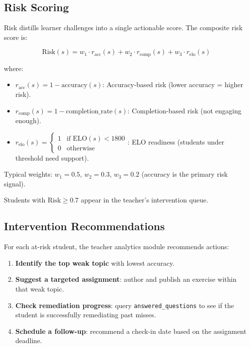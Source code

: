 \documentclass[sigconf,authordraft,twoside]{acmart}
\newcommand{\tech}[1]{\textcolor{brandblue}{\nolinkurl{#1}}}
\begin{document}
\subsection{Risk Scoring} \label{sec:risk-scoring}

Risk distills learner challenges into a single actionable score. The composite risk score is:

\begin{equation}
\text{Risk}(s) = w_1 \cdot r_{\text{acc}}(s) + w_2 \cdot r_{\text{comp}}(s) + w_3 \cdot r_{\text{elo}}(s)
\end{equation}

where:

\begin{itemize}
\item $r_{\text{acc}}(s) = 1 - \text{accuracy}(s)$: Accuracy-based risk (lower accuracy = higher risk).
\item $r_{\text{comp}}(s) = 1 - \text{completion\_rate}(s)$: Completion-based risk (not engaging enough).
\item $r_{\text{elo}}(s) = \begin{cases} 1 & \text{if } \text{ELO}(s) < 1800 \\ 0 & \text{otherwise} \end{cases}$: ELO readiness (students under threshold need support).
\end{itemize}

Typical weights: $w_1 = 0.5$, $w_2 = 0.3$, $w_3 = 0.2$ (accuracy is the primary risk signal).

Students with $\text{Risk} \geq 0.7$ appear in the teacher's intervention queue.

\subsection{Intervention Recommendations}

For each at-risk student, the teacher analytics module recommends actions:

\begin{enumerate}
\item \textbf{Identify the top weak topic} with lowest accuracy.
\item \textbf{Suggest a targeted assignment}: author and publish an exercise within that weak topic.
\item \textbf{Check remediation progress}: query \tech{answered\_questions} to see if the student is successfully remediating past misses.
\item \textbf{Schedule a follow-up}: recommend a check-in date based on the assignment deadline.
\end{enumerate}
\end{document}
